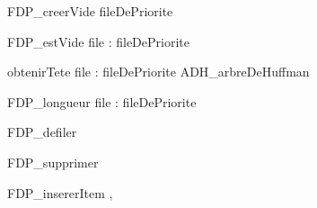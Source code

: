 
\begin{algorithme}

 \signaturefonction
{FDP\_creerVide}
{}
{fileDePriorite}

\signaturefonction
{FDP\_estVide}
{file : fileDePriorite}
{\booleen}

 \signaturefonction
{obtenirTete}
{file : fileDePriorite}
{ADH\_arbreDeHuffman}

\signaturefonction
{FDP\_longueur}
{file : fileDePriorite}
{\naturel}

\signatureProcedure
{FDP\_defiler}
{}


\signatureProcedure
{FDP\_supprimer}
{}


\signatureProcedure
{FDP\_insererItem}
{, }


\end{algorithme}
